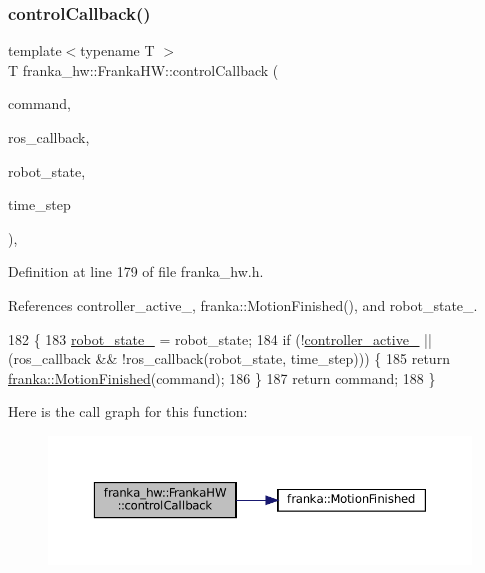 \subsubsection{\texorpdfstring{control\+Callback()}{controlCallback()}}
{\footnotesize\ttfamily template$<$typename T $>$ \\
T franka\+\_\+hw\+::\+Franka\+H\+W\+::control\+Callback (\begin{DoxyParamCaption}\item[{const T \&}]{command,  }\item[{\hyperlink{classfranka__hw_1_1FrankaHW_ac576bd5140a03864888c68519daa5aa4}{Callback}}]{ros\+\_\+callback,  }\item[{const \hyperlink{structfranka_1_1RobotState}{franka\+::\+Robot\+State} \&}]{robot\+\_\+state,  }\item[{\hyperlink{classfranka_1_1Duration}{franka\+::\+Duration}}]{time\+\_\+step }\end{DoxyParamCaption})\hspace{0.3cm}{\ttfamily [inline]}, {\ttfamily [private]}}



Definition at line 179 of file franka\+\_\+hw.\+h.



References controller\+\_\+active\+\_\+, franka\+::\+Motion\+Finished(), and robot\+\_\+state\+\_\+.


\begin{DoxyCode}
182                                               \{
183     \hyperlink{classfranka__hw_1_1FrankaHW_a1b9c3149cda8b7d78d52ecea65a8ebab}{robot\_state\_} = robot\_state;
184     \textcolor{keywordflow}{if} (!\hyperlink{classfranka__hw_1_1FrankaHW_aa207ee4ba133fdb1b3887c9639b47b40}{controller\_active\_} || (ros\_callback && !ros\_callback(robot\_state, time\_step))) \{
185       \textcolor{keywordflow}{return} \hyperlink{namespacefranka_a20791f7142d78bbbe3c957cc66a23ade}{franka::MotionFinished}(command);
186     \}
187     \textcolor{keywordflow}{return} command;
188   \}
\end{DoxyCode}
Here is the call graph for this function\+:
\nopagebreak
\begin{figure}[H]
\begin{center}
\leavevmode
\includegraphics[width=350pt]{classfranka__hw_1_1FrankaHW_a4014fbce5bae60ee693505775ecee499_cgraph}
\end{center}
\end{figure}
\mbox{\label{classfranka__hw_1_1FrankaHW_a8fcc0a82b0c13cdbd1de7fea38c3ecc3}} 
